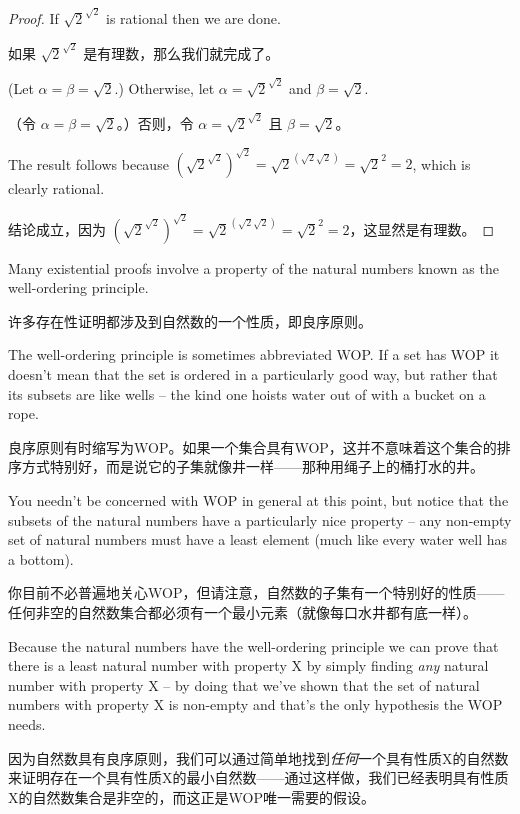 \begin{proof}
If $\sqrt{2}^{\sqrt{2}}$ is rational then we are done.

如果 $\sqrt{2}^{\sqrt{2}}$ 是有理数，那么我们就完成了。

(Let $ \alpha = \beta = \sqrt{2}$.)  Otherwise, let 
$\alpha = \sqrt{2}^{\sqrt{2}}$ and $\beta = \sqrt{2}$.

（令 $ \alpha = \beta = \sqrt{2}$。）否则，令 $\alpha = \sqrt{2}^{\sqrt{2}}$ 且 $\beta = \sqrt{2}$。

The result
follows because $\left(\sqrt{2}^{\sqrt{2}}\right)^{\sqrt{2}} = \sqrt{2}^{(\sqrt{2}\sqrt{2})} 
= \sqrt{2}^2 = 2$, which is clearly rational.

结论成立，因为 $\left(\sqrt{2}^{\sqrt{2}}\right)^{\sqrt{2}} = \sqrt{2}^{(\sqrt{2}\sqrt{2})} = \sqrt{2}^2 = 2$，这显然是有理数。
\end{proof} 

Many existential proofs involve a property of the natural numbers
known as the well-ordering principle.

许多存在性证明都涉及到自然数的一个性质，即良序原则。

The well-ordering principle is 
sometimes abbreviated WOP.  If a set has WOP it doesn't mean that the 
set is ordered in a particularly good way, but rather that its subsets
are like wells -- the kind one hoists water out of with a bucket on a rope.

良序原则有时缩写为WOP。如果一个集合具有WOP，这并不意味着这个集合的排序方式特别好，而是说它的子集就像井一样——那种用绳子上的桶打水的井。

You needn't be concerned with WOP in general at this point, but notice
that the subsets of the natural numbers have a particularly nice property
 -- any non-empty set of natural numbers must have a least element (much like
every water well has a bottom).

你目前不必普遍地关心WOP，但请注意，自然数的子集有一个特别好的性质——任何非空的自然数集合都必须有一个最小元素（就像每口水井都有底一样）。

Because the natural numbers have the well-ordering principle 
we can prove that there is a least 
natural number with property X by simply finding \emph{any} natural
number with property X -- by doing that we've shown that the set of
natural numbers with property X is non-empty and that's the only
hypothesis the WOP needs.

因为自然数具有良序原则，我们可以通过简单地找到\emph{任何}一个具有性质X的自然数来证明存在一个具有性质X的最小自然数——通过这样做，我们已经表明具有性质X的自然数集合是非空的，而这正是WOP唯一需要的假设。


